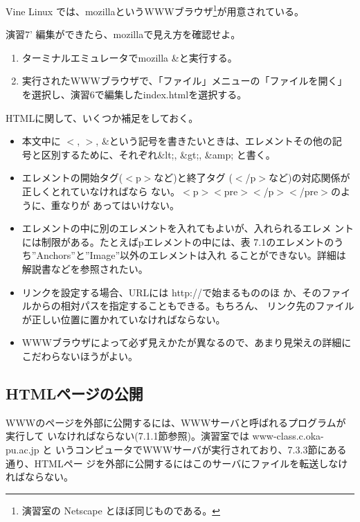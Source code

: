 \documentclass[a4j,10pt]{jarticle}
\begin{document}
Vine Linux では、{\sffamily mozilla}というWWWブラウザ\footnote{演習室の 
Netscape とほぼ同じものである。}が用意されている。
\begin{itembox}{演習7'}
編集ができたら、{\sffamily mozilla}で見え方を確認せよ。
\begin{enumerate}
 \item ターミナルエミュレータで{\sffamily mozilla \&}と実行する。
 \item 実行されたWWWブラウザで、「ファイル」メニューの「ファイルを開く」
       を選択し、演習6で編集した{\sffamily index.html}を選択する。
\end{enumerate}
\end{itembox}

HTMLに関して、いくつか補足をしておく。
\begin{itemize}
 \item 本文中に $<$, $>$, \&という記号を書きたいときは、エレメントその他の記
       号と区別するために、それぞれ\&lt;, \&gt;, \&amp; と書く。 
 \item エレメントの開始タグ({\sffamily $<$p$>$}など)と終了タグ
       ({\sffamily $<$/p$>$}など)の対応関係が正しくとれていなければなら
       ない。{\sffamily $<$p$><$pre$><$/p$><$/pre$>$}のように、重なりが
       あってはいけない。
 \item エレメントの中に別のエレメントを入れてもよいが、入れられるエレメ
       ントには制限がある。たとえば{\sffamily p}エレメントの中には、表
       7.1のエレメントのうち''Anchors''と''Image''以外のエレメントは入れ
       ることができない。詳細は解説書などを参照されたい。
 \item リンクを設定する場合、URLには {\sffamily http://}で始まるもののほ
       か、そのファイルからの相対パスを指定することもできる。もちろん、
       リンク先のファイルが正しい位置に置かれていなければならない。
 \item WWWブラウザによって必ず見えかたが異なるので、あまり見栄えの詳細に
       こだわらないほうがよい。
\end{itemize}

\subsection{HTMLページの公開}
WWWのページを外部に公開するには、WWWサーバと呼ばれるプログラムが実行して
いなければならない(7.1.1節参照)。演習室では www-class.c.oka-pu.ac.jp と
いうコンピュータでWWWサーバが実行されており、7.3.3節にある通り、HTMLペー
ジを外部に公開するにはこのサーバにファイルを転送しなければならない。
\end{document}

